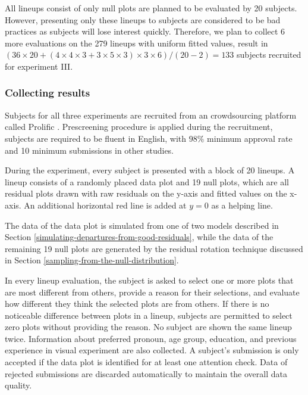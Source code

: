 \documentclass[]{interact}
\theoremstyle{plain}%
\theoremstyle{definition}
\theoremstyle{remark}
\begin{document}
All lineups consist of only null plots are planned to be evaluated by 20
subjects. However, presenting only these lineups to subjects are
considered to be bad practices as subjects will lose interest quickly.
Therefore, we plan to collect 6 more evaluations on the 279 lineups with
uniform fitted values, result in
\((36 \times 20 + (4 \times 4 \times 3 + 3 \times 5 \times 3) \times 3 \times 6) / (20-2) = 133\)
subjects recruited for experiment III.

\hypertarget{collecting-results}{%
\subsubsection{Collecting results}\label{collecting-results}}

Subjects for all three experiments are recruited from an crowdsourcing
platform called Prolific \citep{palan2018prolific}. Prescreening
procedure is applied during the recruitment, subjects are required to be
fluent in English, with \(98\%\) minimum approval rate and 10 minimum
submissions in other studies.

During the experiment, every subject is presented with a block of 20
lineups. A lineup consists of a randomly placed data plot and 19 null
plots, which are all residual plots drawn with raw residuals on the
y-axis and fitted values on the x-axis. An additional horizontal red
line is added at \(y = 0\) as a helping line.

The data of the data plot is simulated from one of two models described
in Section \ref{simulating-departures-from-good-residuals}, while the
data of the remaining 19 null plots are generated by the residual
rotation technique discussed in Section
\ref{sampling-from-the-null-distribution}.

In every lineup evaluation, the subject is asked to select one or more
plots that are most different from others, provide a reason for their
selections, and evaluate how different they think the selected plots are
from others. If there is no noticeable difference between plots in a
lineup, subjects are permitted to select zero plots without providing
the reason. No subject are shown the same lineup twice. Information
about preferred pronoun, age group, education, and previous experience
in visual experiment are also collected. A subject's submission is only
accepted if the data plot is identified for at least one attention
check. Data of rejected submissions are discarded automatically to
maintain the overall data quality.
\end{document}
